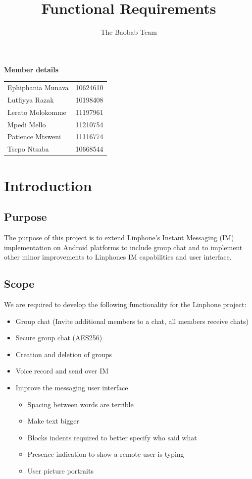 \documentclass[a4paper]{article}
\title{Functional Requirements}
\author{The Baobab Team}
\begin{document}
\newpage


\newpage
\begin{center}
\LARGE \textbf{Member details}\\
\begin{tabular}{ll}
Ephiphania Munava&10624610\\
Lutfiyya Razak&10198408\\
Lerato Molokomme&11197961\\
Mpedi Mello&11210754\\
Patience Mtsweni&11116774\\
Tsepo Ntsaba&10668544\\

\end{tabular}
\end{center}

\newpage
\tableofcontents
\listoffigures
\newpage

\section{\textbf{\huge{Introduction}}}
\subsection{Purpose}
The purpose of this project is to extend Linphone's Instant Messaging (IM) implementation on Android platforms to include group chat and to implement other minor improvements to Linphones IM capabilities and user interface. 

\subsection{Scope}
We are required to develop the following functionality for the Linphone project:
\begin{itemize}
\item Group chat (Invite additional members to a chat, all members receive chats)
\item Secure group chat (AES256)
\item Creation and deletion of groups
\item Voice record and send over IM
\item Improve the messaging user interface
	\begin{itemize}
		\item Spacing between words are terrible
		\item Make text bigger
		\item Blocks indents required to better specify who said what
		\item Presence indication to show a remote user is typing
		\item User picture portraits
	\end{itemize}
\end{itemize}
\end{document}
